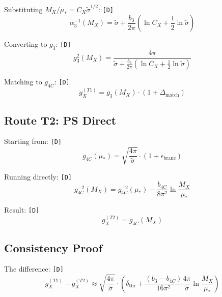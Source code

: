 \documentclass[11pt,a4paper]{article}
\newcommand{\tagD}{\textcolor{green!50!black}{\texttt{[D]}}}
\theoremstyle{definition}
\begin{document}
Substituting $M_X/\mu_* = C_X \tilde{\sigma}^{1/2}$: \tagD{}
\begin{equation}
\label{eq:app-t1-subst}
\alpha_3^{-1}(M_X) = \tilde{\sigma} + \frac{b_3}{2\pi}\left(\ln C_X + \frac{1}{2}\ln\tilde{\sigma}\right)
\end{equation}

Converting to $g_3$: \tagD{}
\begin{equation}
\label{eq:app-t1-g3}
g_3^2(M_X) = \frac{4\pi}{\tilde{\sigma} + \frac{b_3}{2\pi}(\ln C_X + \frac{1}{2}\ln\tilde{\sigma})}
\end{equation}

Matching to $g_{4C}$: \tagD{}
\begin{equation}
\label{eq:app-t1-match}
g_X^{(T1)} = g_3(M_X) \cdot (1 + \Delta_{\text{match}})
\end{equation}

\subsection{Route T2: PS Direct}
\label{app:route-t2-detail}

Starting from: \tagD{}
\begin{equation}
\label{eq:app-t2-start}
g_{4C}(\mu_*) = \sqrt{\frac{4\pi}{\tilde{\sigma}}} \cdot (1 + \epsilon_{\text{brane}})
\end{equation}

Running directly: \tagD{}
\begin{equation}
\label{eq:app-t2-run}
g_{4C}^{-2}(M_X) = g_{4C}^{-2}(\mu_*) - \frac{b_{4C}}{8\pi^2}\ln\frac{M_X}{\mu_*}
\end{equation}

Result: \tagD{}
\begin{equation}
\label{eq:app-t2-result}
g_X^{(T2)} = g_{4C}(M_X)
\end{equation}

\subsection{Consistency Proof}
\label{app:gx-consistency}

The difference: \tagD{}
\begin{equation}
\label{eq:app-gx-diff}
g_X^{(T1)} - g_X^{(T2)} \approx \sqrt{\frac{4\pi}{\tilde{\sigma}}} \cdot \left(\delta_{\text{thr}} + \frac{(b_3-b_{4C})}{16\pi^2}\frac{4\pi}{\tilde{\sigma}}\ln\frac{M_X}{\mu_*}\right)
\end{equation}
\end{document}
